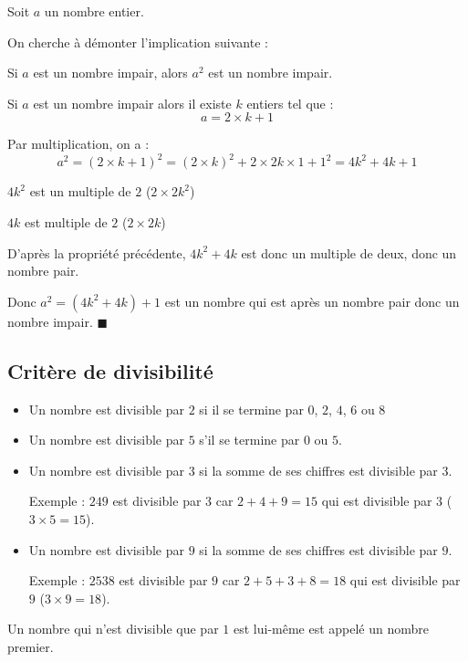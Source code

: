 \begin{deme}{}{}
Soit $a$ un nombre entier.

\noindent On cherche à démonter l'implication suivante : 
\begin{center}
Si $a$ est un nombre impair, alors $a^2$ est un nombre impair.
\end{center}

\medskip
Si $a$ est un nombre impair alors il existe $k$ entiers tel que :
$$ a =2\times k+1 $$

Par multiplication, on a :
$$ a^2 = \left(2\times k+1 \right)^2 = (2\times k)^2 + 2 \times 2k \times 1 + 1^2 = 4k^2 + 4k +1$$

$4k^2$ est un multiple de $2$ ($2 \times 2k^2$)

$4k$ est multiple de $2$ ($2 \times 2k$)

D'après la propriété précédente, $4k^2+4k$ est donc un multiple de deux, donc un nombre pair.

Donc $a^2 = (4k^2 + 4k) +1$ est un nombre qui est après un nombre pair donc un nombre impair. \hfill $\blacksquare$
\end{deme}

\subsection{Critère de divisibilité}

\begin{methode}{}{}
\begin{itemize}
\item  Un nombre est divisible par $2$ si il se termine par $0$, $2$, $4$, $6$ ou $8$
\item  Un nombre est divisible par $5$ s'il se termine par $0$ ou $5$.

\item  Un nombre est divisible par $3$ si la somme de ses chiffres est divisible par $3$.

Exemple : $249$ est divisible par $3$ car $2 + 4 + 9 = 15$ qui est divisible par $3$ ($3 \times 5 = 15$).

\item  Un nombre est divisible par $9$ si la somme de ses chiffres est divisible par $9$.

Exemple : $2 538$ est divisible par $9$ car $2 + 5 + 3 + 8 = 18$ qui est divisible par $9$ ($3 \times 9 = 18$).
\end{itemize}
\end{methode}

\begin{defi}{}{}
Un nombre qui n'est divisible que par $1$ est lui-même est appelé un nombre premier.
\end{defi}

